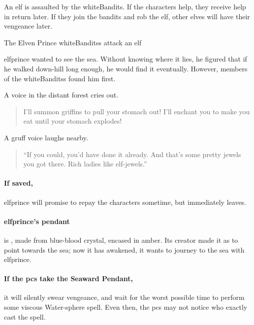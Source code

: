 \label{littleprince}

\noindent
An elf is assaulted by the \gls{whiteBandits}.
If the characters help, they receive help in return later.
If they join the bandits and rob the elf, other elves will have their vengeance later.

{The Elven Prince}%
{\Glspl{whiteBandits} attack an elf}%

\Gls{elfprince} wanted to see the sea.
Without knowing where it lies, he figured that if he walked down-hill long enough, he would find it eventually.
However, members of the \glspl{whiteBandits} found him first.

\begin{boxtext}
  A voice in the distant forest cries out.
  \begin{quote}
    I'll summon griffins to pull your stomach out!  I'll enchant you to make you eat until your stomach explodes!
  \end{quote}

  A gruff voice laughs nearby.

  \begin{quote}
    ``If you could, you'd have done it already.  And that's some pretty jewels you got there.  Rich ladies like elf-jewels.''
  \end{quote}

\end{boxtext}


\elfprince

\showStdSpells

\paragraph{If saved,}
\gls{elfprince} will promise to repay the characters sometime, but immediately leaves.

\paragraph{\Gls{elfprince}'s pendant}
is , made from blue-blood crystal, encased in amber.
Its creator made it as  to point towards the sea; now it has awakened, it wants to journey to the sea with \gls{elfprince}.

\paragraph{If the \glspl{pc} take the Seaward Pendant,}
it will silently swear vengeance, and wait for the worst possible time to perform some viscous Water-\gls{sphere} \gls{spell}.
Even then, the \glspl{pc} may not notice who exactly cast the spell.

